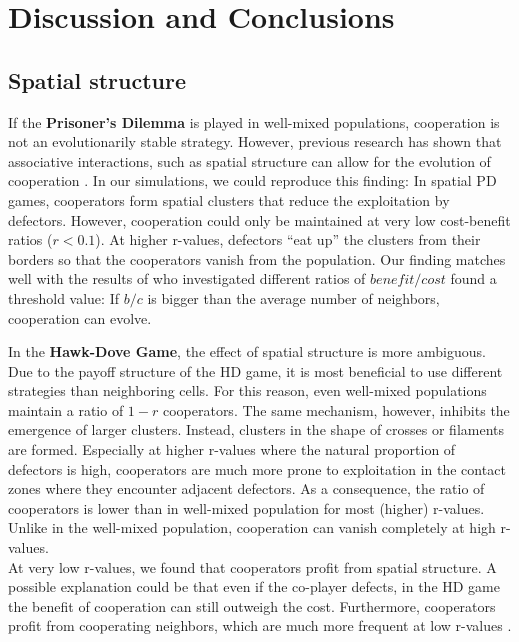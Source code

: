 \section{Discussion and Conclusions}


\subsection{Spatial structure}

If the \textbf{Prisoner's Dilemma} is played in well-mixed populations, cooperation is not an evolutionarily stable strategy. However, previous research has shown that associative interactions, such as spatial structure can allow for the evolution of cooperation \citep{nowak1992,doebeli1998evolution,killingback1999variable}. In our simulations, we could reproduce this finding: In spatial PD games, cooperators form spatial clusters that reduce the exploitation by defectors.
However, cooperation could only be maintained at very low cost-benefit ratios ($r<0.1$). At higher r-values, defectors ``eat up'' the clusters from their borders so that the cooperators vanish from the population. Our finding matches well with the results of \cite{ohtsuki2006simple} who investigated different ratios of $benefit / cost$ found a threshold value: If $b/c$ is bigger than the average number of neighbors, cooperation can evolve. 


In the \textbf{Hawk-Dove Game}, the effect of spatial structure is more ambiguous. Due to the payoff structure of the HD game, it is most beneficial to use different strategies than neighboring cells. For this reason, even well-mixed populations maintain a ratio of $1-r$ cooperators. The same mechanism, however, inhibits the emergence of larger clusters. Instead, clusters in the shape of crosses or filaments are formed. Especially at higher r-values where the natural proportion of defectors is high, cooperators are much more prone to exploitation in the contact zones where they encounter adjacent defectors. As a consequence, the ratio of cooperators is lower than in well-mixed population for most (higher) r-values. Unlike in the well-mixed population, cooperation can vanish completely at high r-values. \\
At very low r-values, we found that cooperators profit from spatial structure. A possible explanation could be that even if the co-player defects, in the HD game the benefit of cooperation can still outweigh the cost. Furthermore, cooperators profit from cooperating neighbors, which are much more frequent at low r-values \citep{HauertandDoebeli2004}. 



